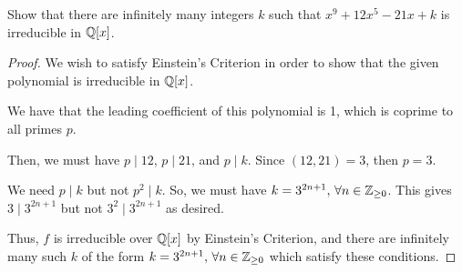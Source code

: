 \documentclass[../hw6]{subfiles}
\begin{document}
\begin{problem}
Show that there are infinitely many integers $k$ such that $x^9+12x^5-21x+k$ is irreducible in  $\mathbb{Q}[x]$.
\end{problem}
\begin{proof}
	We wish to satisfy Einstein's Criterion in order to show that the given polynomial is irreducible in $\mathbb{Q}[x]$.

	We have that the leading coefficient of this polynomial is 1, which is coprime to all primes $p$.

	Then, we must have $p\mid 12$, $p\mid 21$, and $p\mid k$.
	Since $(12,21)=3$, then $p=3$.

	We need $p\mid k$ but not $p^2\mid k$.
	So, we must have $k=3^{2n+1},\, \forall n \in \mathbb{Z}_{\ge 0}$.
	This gives $3\mid 3^{2n+1}$ but not $3^2\mid 3^{2n+1}$ as desired.

	Thus, $f$ is irreducible over $\mathbb{Q}[x]$ by Einstein's Criterion,
	and there are infinitely many such $k$ of the form  $k=3^{2n+1},\, \forall n \in \mathbb{Z}_{\ge 0}$ which satisfy these conditions.
\end{proof}
\end{document}

